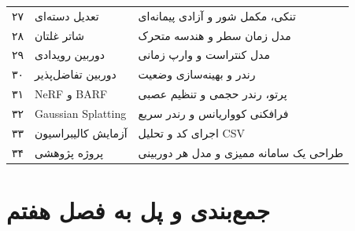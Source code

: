 \documentclass[12pt,openany,oneside]{book}
\begin{document}
\begin{videobox}
\begin{longtable}{p{1.2cm}p{5.1cm}p{8.2cm}}
۲۷ & تعدیل دسته‌ای & تنکی، مکمل شور و آزادی پیمانه‌ای\\
۲۸ & شاتر غلتان & مدل زمان سطر و هندسه متحرک\\
۲۹ & دوربین رویدادی & مدل کنتراست و وارپ زمانی\\
۳۰ & دوربین تفاضل‌پذیر & رندر و بهینه‌سازی وضعیت\\
۳۱ & NeRF و BARF & پرتو، رندر حجمی و تنظیم عصبی\\
۳۲ & Gaussian Splatting & فرافکنی کوواریانس و رندر سریع\\
۳۳ & آزمایش کالیبراسیون & اجرای کد و تحلیل CSV\\
۳۴ & پروژه پژوهشی & طراحی یک سامانه ممیزی و مدل هر دوربینی\\
\bottomrule
\end{longtable}
\end{videobox}

\section{جمع‌بندی و پل به فصل هفتم}
\end{document}
